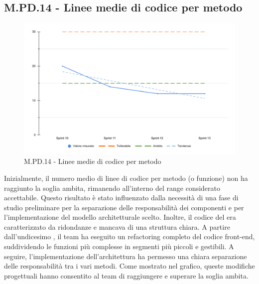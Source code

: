 \subsection{M.PD.14 - Linee medie di codice per metodo}

\begin{figure}[H]
  \centering
  \includegraphics[width=\textwidth]{assets/linee_medie_codice.pdf}
  \caption{M.PD.14 - Linee medie di codice per metodo}
\end{figure}

\par Inizialmente, il numero medio di linee di codice per metodo (o funzione) non ha raggiunto la soglia ambita, rimanendo all'interno del range considerato accettabile. Questo risultato è stato influenzato dalla necessità di una fase di studio preliminare per la separazione delle responsabilità dei componenti e per l'implementazione del modello architetturale scelto. Inoltre, il codice del  era caratterizzato da ridondanze e mancava di una struttura chiara. A partire dall'undicesimo , il team ha eseguito un refactoring completo del codice front-end, suddividendo le funzioni più complesse in segmenti più piccoli e gestibili. A seguire, l'implementazione dell'architettura  ha permesso una chiara separazione delle responsabilità tra i vari metodi. Come mostrato nel grafico, queste modifiche progettuali hanno consentito al team di raggiungere e superare la soglia ambita.
